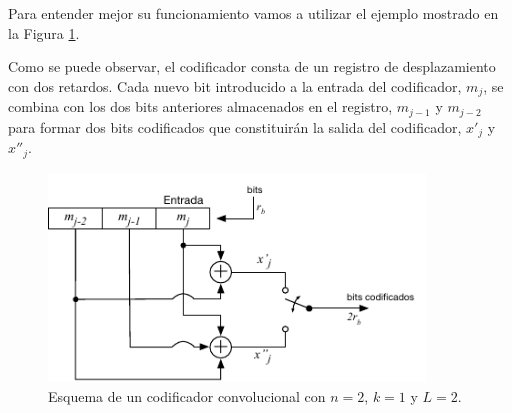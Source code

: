 \documentclass[es,apuntes]{uah}
\begin{document}
{Para entender mejor su funcionamiento vamos a utilizar el ejemplo mostrado en la Figura \ref{fig:CodificadorConvolucional}.


%
%
%
%
%

Como se puede observar, el codificador consta de un registro de desplazamiento con dos retardos. Cada nuevo bit introducido a la entrada del codificador, $m_j$, se combina con los dos bits anteriores almacenados en el registro, $m_{j-1}$ y $m_{j-2}$ para formar dos bits codificados que constituirán la salida del codificador, $x'_j$ y $x''_j$. 

\begin{figure}[h!]
	\centering\includegraphics[width=10cm]{./Figuras/CodificadorConvolucional}
	\caption{Esquema de un codificador convolucional con $n=2$, $k=1$ y $L=2$.}	
	\label{fig:CodificadorConvolucional}
\end{figure}


}
\end{document}
